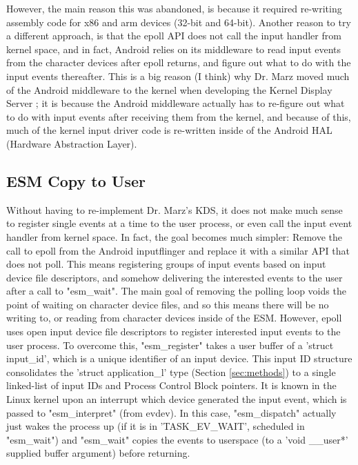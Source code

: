 \documentclass[10pt,journal,compsoc]{IEEEtran}
\begin{document}
However, the main reason this was abandoned, is because it required re-writing assembly code for x86 and arm devices (32-bit and 64-bit). Another reason to try a different approach, is that the epoll API does not call the input handler from kernel space, and in fact, Android relies on its middleware to read input events from the character devices after epoll returns, and figure out what to do with the input events thereafter. This is a big reason (I think) why Dr. Marz moved much of the Android middleware to the kernel when developing the Kernel Display Server \cite{8413093}; it is because the Android middleware actually has to re-figure out what to do with input events after receiving them from the kernel, and because of this, much of the kernel input driver code is re-written inside of the Android HAL (Hardware Abstraction Layer).

\subsection{ESM Copy to User}
\label{sec:copytouser}
Without having to re-implement Dr. Marz's KDS, it does not make much sense to register single events at a time to the user process, or even call the input event handler from kernel space. In fact, the goal becomes much simpler: Remove the call to epoll from the Android inputflinger and replace it with a similar API that does not poll. This means registering groups of input events based on input device file descriptors, and somehow delivering the interested events to the user after a call to "esm\_wait". The main goal of removing the polling loop voids the point of waiting on character device files, and so this means there will be no writing to, or reading from character devices inside of the ESM. However, epoll uses open input device file descriptors to register interested input events to the user process. To overcome this, "esm\_register" takes a user buffer of a 'struct input\_id', which is a unique identifier of an input device. This input ID structure consolidates the 'struct application\_l' type (Section \ref{sec:methods}) to a single linked-list of input IDs and Process Control Block pointers. It is known in the Linux kernel upon an interrupt which device generated the input event, which is passed to "esm\_interpret" (from evdev). In this case, "esm\_dispatch" actually just wakes the process up (if it is in 'TASK\_EV\_WAIT', scheduled in "esm\_wait") and "esm\_wait" copies the events to userspace (to a 'void \_\_user*' supplied buffer argument) before returning. 
\end{document}
